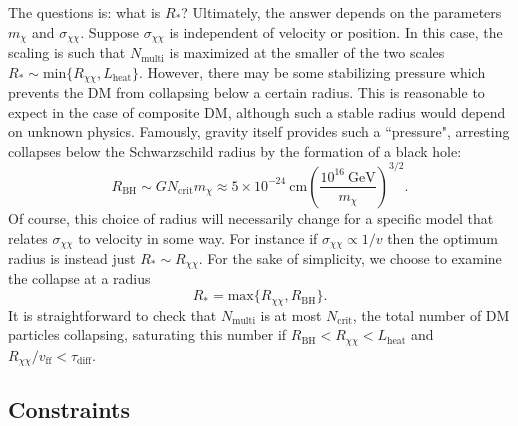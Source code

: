 \documentclass[preprintnumbers,amsmath,amssymb,prd,superscriptaddress]{revtex4}
\newcommand{\GeV}{\text{GeV}}
\newcommand{\cm}{\text{cm}}
\def\r{\right)}
\def\l{\left(}
\begin{document}
The questions is: what is $R_*$?
Ultimately, the answer depends on the parameters $m_\chi$ and $\sigma_{\chi \chi}$. 
Suppose $\sigma_{\chi \chi}$ is independent of velocity or position.
In this case, the scaling is such that $N_\text{multi}$ is maximized at the smaller of the two scales $R_* \sim \text{min}\{R_{\chi \chi}, L_\text{heat}\}$. 
However, there may be some stabilizing pressure which prevents the DM from collapsing below a certain radius.
This is reasonable to expect in the case of composite DM, although such a stable radius would depend on unknown physics. 
Famously, gravity itself provides such a ``pressure", arresting collapses below the Schwarzschild radius by the formation of a black hole:
\begin{equation}
R_\text{BH} \sim G N_\text{crit} m_\chi \approx 5 \times 10^{-24} ~\cm \l \frac{10^{16} ~\GeV}{m_\chi} \r^{3/2}.
\end{equation}
Of course, this choice of radius will necessarily change for a specific model that relates $\sigma_{\chi \chi}$ to velocity in some way. 
For instance if $\sigma_{\chi \chi} \propto 1/v$ then the optimum radius is instead just $R_* \sim R_{\chi \chi}$.
For the sake of simplicity, we choose to examine the collapse at a radius
\begin{equation}
R_* = \text{max}\{R_{\chi \chi}, R_\text{BH}\}.
\end{equation}
It is straightforward to check that $N_\text{multi}$ is at most $N_\text{crit}$, the total number of DM particles collapsing, saturating this number if $R_\text{BH} < R_{\chi \chi} < L_\text{heat}$ and $R_{\chi \chi}/v_\text{ff} < \tau_\text{diff}$. 

\subsection{Constraints}
\end{document}
